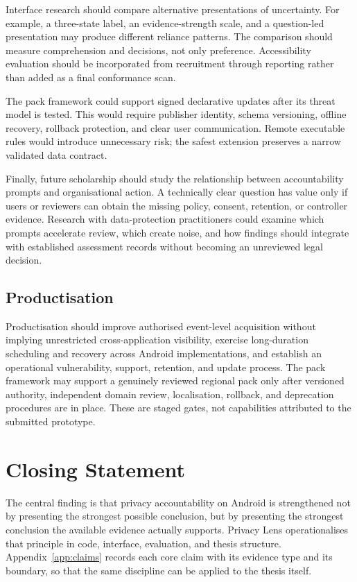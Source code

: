 Interface research should compare alternative presentations of uncertainty. For example, a three-state label, an evidence-strength scale, and a question-led presentation may produce different reliance patterns. The comparison should measure comprehension and decisions, not only preference. Accessibility evaluation should be incorporated from recruitment through reporting rather than added as a final conformance scan.

The pack framework could support signed declarative updates after its threat model is tested. This would require publisher identity, schema versioning, offline recovery, rollback protection, and clear user communication. Remote executable rules would introduce unnecessary risk; the safest extension preserves a narrow validated data contract.

Finally, future scholarship should study the relationship between accountability prompts and organisational action. A technically clear question has value only if users or reviewers can obtain the missing policy, consent, retention, or controller evidence. Research with data-protection practitioners could examine which prompts accelerate review, which create noise, and how findings should integrate with established assessment records without becoming an unreviewed legal decision.

\subsection{Productisation}

Productisation should improve authorised event-level acquisition without implying unrestricted cross-application visibility, exercise long-duration scheduling and recovery across Android implementations, and establish an operational vulnerability, support, retention, and update process. The pack framework may support a genuinely reviewed regional pack only after versioned authority, independent domain review, localisation, rollback, and deprecation procedures are in place. These are staged gates, not capabilities attributed to the submitted prototype.

\section{Closing Statement}

The central finding is that privacy accountability on Android is strengthened not by presenting the strongest possible conclusion, but by presenting the strongest conclusion the available evidence actually supports. Privacy Lens operationalises that principle in code, interface, evaluation, and thesis structure. Appendix~\ref{app:claims} records each core claim with its evidence type and its boundary, so that the same discipline can be applied to the thesis itself.
